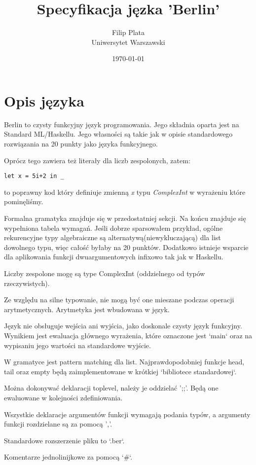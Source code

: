 \documentclass[12pt]{article}
\title{Specyfikacja jęzka 'Berlin'}
\author{
        Filip Plata \\
        Uniwersytet Warszawski
}
\date{\today}
\begin{document}
\maketitle

\section{Opis języka}
Berlin to czysty funkcyjny język programowania. Jego składnia oparta jest na Standard ML/Haskellu. Jego własności są takie jak w opisie standardowego rozwiązania na 20 punkty jako języka funkcyjnego.

Oprócz tego zawiera też literały dla liczb zespolonych, zatem:

\begin{lstlisting}
let x = 5i+2 in _
\end{lstlisting}

to poprawny kod który definiuje zmienną \textit{x} typu \textit{ComplexInt} w wyrażeniu które pominęliśmy.

Formalna gramatyka znajduje się w przedostatniej sekcji.
Na końcu znajduje się wypełniona tabela wymagań.
Jeśli dobrze sparsowałem przykład, ogólne rekurencyjne typy algebraiczne są alternatywą(niewykluczającą) dla list dowolnego typu, więc całość byłaby na 20 punktów.
Dodatkowo istnieje wsparcie dla aplikowania funkcji dwuargumentowych infixowo tak jak
w Haskellu.

Liczby zespolone mogę są type ComplexInt (oddzielnego od typów rzeczywistych).

Ze względu na silne typowanie, nie mogą być one mieszane podczas operacji arytmetycznych. Arytmetyka jest wbudowana w język.

Język nie obsługuje wejścia ani wyjścia, jako doskonale czysty język funkcyjny. Wynikiem jest ewaluacja głównego wyrażenia, które oznaczone jest `main` oraz na wypisaniu jego wartości na standardowe wyjście.

W gramatyce jest pattern matching dla list. Najprawdopodobniej funkcje head, tail oraz empty będą zaimplementowane w krótkiej `bibliotece standardowej`.

Można dokonywać deklaracji toplevel, należy je oddzielać ';;'. Będą one ewaluowane w kolejności zdefiniowania.

Wszystkie deklaracje argumentów funkcji wymagają podania typów, a argumenty funkcji rozdzielane są za pomocą ','.

Standardowe rozszerzenie pliku to `.ber`.

Komentarze jednolinijkowe za pomocą `\#`.
\end{document}
